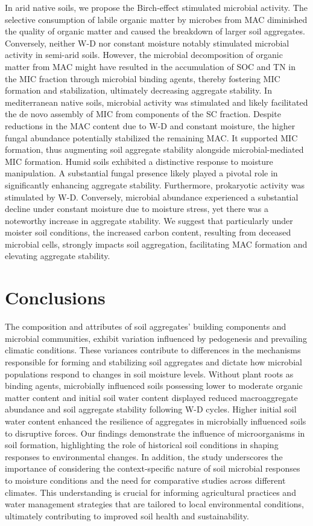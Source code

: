 In arid native soils, we propose the Birch-effect stimulated microbial activity. 
The selective consumption of labile organic matter by microbes from MAC diminished the quality of organic matter and caused the breakdown of larger soil aggregates. 
Conversely, neither W-D nor constant moisture notably stimulated microbial activity in semi-arid soils. 
However, the microbial decomposition of organic matter from MAC might have resulted in the accumulation of SOC and TN in the MIC fraction through microbial binding agents, thereby fostering MIC formation and stabilization, ultimately decreasing aggregate stability. 
In mediterranean native soils, microbial activity was stimulated and likely facilitated the de novo assembly of MIC from components of the SC fraction. 
Despite reductions in the MAC content due to W-D and constant moisture, the higher fungal abundance potentially stabilized the remaining MAC. 
It supported MIC formation, thus augmenting soil aggregate stability alongside microbial-mediated MIC formation. 
Humid soils exhibited a distinctive response to moisture manipulation. 
A substantial fungal presence likely played a pivotal role in significantly enhancing aggregate stability. 
Furthermore, prokaryotic activity was stimulated by W-D. 
Conversely, microbial abundance experienced a substantial decline under constant moisture due to moisture stress, yet there was a noteworthy increase in aggregate stability. 
We suggest that particularly under moister soil conditions, the increased carbon content, resulting from deceased microbial cells, strongly impacts soil aggregation, facilitating MAC formation and elevating aggregate stability.

\section{Conclusions}

The composition and attributes of soil aggregates' building components and microbial communities, exhibit variation influenced by pedogenesis and prevailing climatic conditions. 
These variances contribute to differences in the mechanisms responsible for forming and stabilizing soil aggregates and dictate how microbial populations respond to changes in soil moisture levels. 
Without plant roots as binding agents, microbially influenced soils possessing lower to moderate organic matter content and initial soil water content displayed reduced macroaggregate abundance and soil aggregate stability following W-D cycles. 
Higher initial soil water content enhanced the resilience of aggregates in microbially influenced soils to disruptive forces. 
Our findings demonstrate the influence of microorganisms in soil formation, highlighting the role of historical soil conditions in shaping responses to environmental changes. 
In addition, the study underscores the importance of considering the context-specific nature of soil microbial responses to moisture conditions and the need for comparative studies across different climates. 
This understanding is crucial for informing agricultural practices and water management strategies that are tailored to local environmental conditions, ultimately contributing to improved soil health and sustainability. 

